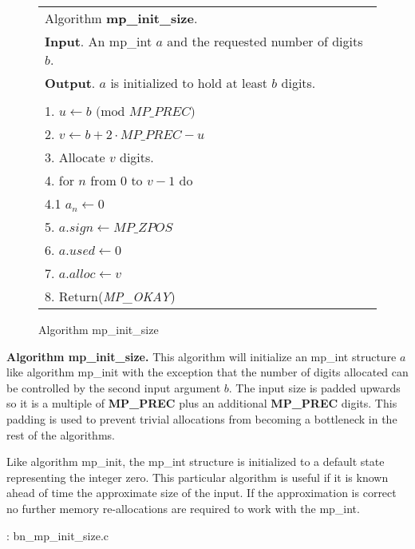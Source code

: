 \documentclass[b5paper]{book}
\begin{document}
\begin{figure}[here]
\begin{small}
\begin{center}
\begin{tabular}{l}
\hline Algorithm \textbf{mp\_init\_size}. \\
\textbf{Input}.   An mp\_int $a$ and the requested number of digits $b$. \\
\textbf{Output}.  $a$ is initialized to hold at least $b$ digits. \\
\hline \\
1.  $u \leftarrow b \mbox{ (mod }MP\_PREC\mbox{)}$ \\
2.  $v \leftarrow b + 2 \cdot MP\_PREC - u$ \\
3.  Allocate $v$ digits. \\
4.  for $n$ from $0$ to $v - 1$ do \\
\hspace{3mm}4.1  $a_n \leftarrow 0$ \\
5.  $a.sign \leftarrow MP\_ZPOS$\\
6.  $a.used \leftarrow 0$\\
7.  $a.alloc \leftarrow v$\\
8.  Return(\textit{MP\_OKAY})\\
\hline
\end{tabular}
\end{center}
\end{small}
\caption{Algorithm mp\_init\_size}
\end{figure}

\textbf{Algorithm mp\_init\_size.}
This algorithm will initialize an mp\_int structure $a$ like algorithm mp\_init with the exception that the number of 
digits allocated can be controlled by the second input argument $b$.  The input size is padded upwards so it is a 
multiple of \textbf{MP\_PREC} plus an additional \textbf{MP\_PREC} digits.  This padding is used to prevent trivial 
allocations from becoming a bottleneck in the rest of the algorithms.

Like algorithm mp\_init, the mp\_int structure is initialized to a default state representing the integer zero.  This 
particular algorithm is useful if it is known ahead of time the approximate size of the input.  If the approximation is
correct no further memory re-allocations are required to work with the mp\_int.

\vspace{+3mm}\begin{small}
\hspace{-5.1mm}{\bf File}: bn\_mp\_init\_size.c
\vspace{-3mm}
\begin{alltt}
\end{alltt}
\end{small}
\end{document}
